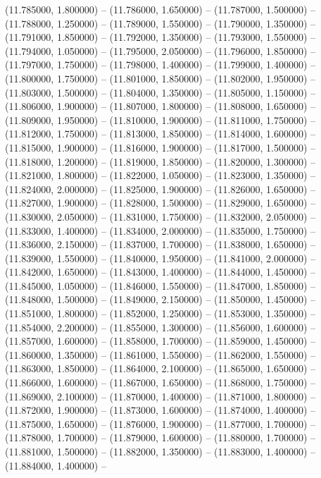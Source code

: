 (11.785000, 1.800000) -- 
(11.786000, 1.650000) -- 
(11.787000, 1.500000) -- 
(11.788000, 1.250000) -- 
(11.789000, 1.550000) -- 
(11.790000, 1.350000) -- 
(11.791000, 1.850000) -- 
(11.792000, 1.350000) -- 
(11.793000, 1.550000) -- 
(11.794000, 1.050000) -- 
(11.795000, 2.050000) -- 
(11.796000, 1.850000) -- 
(11.797000, 1.750000) -- 
(11.798000, 1.400000) -- 
(11.799000, 1.400000) -- 
(11.800000, 1.750000) -- 
(11.801000, 1.850000) -- 
(11.802000, 1.950000) -- 
(11.803000, 1.500000) -- 
(11.804000, 1.350000) -- 
(11.805000, 1.150000) -- 
(11.806000, 1.900000) -- 
(11.807000, 1.800000) -- 
(11.808000, 1.650000) -- 
(11.809000, 1.950000) -- 
(11.810000, 1.900000) -- 
(11.811000, 1.750000) -- 
(11.812000, 1.750000) -- 
(11.813000, 1.850000) -- 
(11.814000, 1.600000) -- 
(11.815000, 1.900000) -- 
(11.816000, 1.900000) -- 
(11.817000, 1.500000) -- 
(11.818000, 1.200000) -- 
(11.819000, 1.850000) -- 
(11.820000, 1.300000) -- 
(11.821000, 1.800000) -- 
(11.822000, 1.050000) -- 
(11.823000, 1.350000) -- 
(11.824000, 2.000000) -- 
(11.825000, 1.900000) -- 
(11.826000, 1.650000) -- 
(11.827000, 1.900000) -- 
(11.828000, 1.500000) -- 
(11.829000, 1.650000) -- 
(11.830000, 2.050000) -- 
(11.831000, 1.750000) -- 
(11.832000, 2.050000) -- 
(11.833000, 1.400000) -- 
(11.834000, 2.000000) -- 
(11.835000, 1.750000) -- 
(11.836000, 2.150000) -- 
(11.837000, 1.700000) -- 
(11.838000, 1.650000) -- 
(11.839000, 1.550000) -- 
(11.840000, 1.950000) -- 
(11.841000, 2.000000) -- 
(11.842000, 1.650000) -- 
(11.843000, 1.400000) -- 
(11.844000, 1.450000) -- 
(11.845000, 1.050000) -- 
(11.846000, 1.550000) -- 
(11.847000, 1.850000) -- 
(11.848000, 1.500000) -- 
(11.849000, 2.150000) -- 
(11.850000, 1.450000) -- 
(11.851000, 1.800000) -- 
(11.852000, 1.250000) -- 
(11.853000, 1.350000) -- 
(11.854000, 2.200000) -- 
(11.855000, 1.300000) -- 
(11.856000, 1.600000) -- 
(11.857000, 1.600000) -- 
(11.858000, 1.700000) -- 
(11.859000, 1.450000) -- 
(11.860000, 1.350000) -- 
(11.861000, 1.550000) -- 
(11.862000, 1.550000) -- 
(11.863000, 1.850000) -- 
(11.864000, 2.100000) -- 
(11.865000, 1.650000) -- 
(11.866000, 1.600000) -- 
(11.867000, 1.650000) -- 
(11.868000, 1.750000) -- 
(11.869000, 2.100000) -- 
(11.870000, 1.400000) -- 
(11.871000, 1.800000) -- 
(11.872000, 1.900000) -- 
(11.873000, 1.600000) -- 
(11.874000, 1.400000) -- 
(11.875000, 1.650000) -- 
(11.876000, 1.900000) -- 
(11.877000, 1.700000) -- 
(11.878000, 1.700000) -- 
(11.879000, 1.600000) -- 
(11.880000, 1.700000) -- 
(11.881000, 1.500000) -- 
(11.882000, 1.350000) -- 
(11.883000, 1.400000) -- 
(11.884000, 1.400000) -- 
